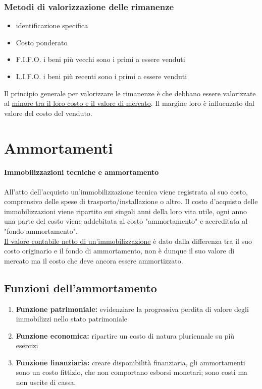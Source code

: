 \documentclass{report}
\begin{document}
	\subsubsection{Metodi di valorizzazione delle rimanenze}
	\begin{itemize}
		\item identificazione specifica
		\item Costo ponderato
		\item F.I.F.O. i beni più vecchi sono i primi a essere venduti
		\item L.I.F.O. i beni più recenti sono i primi a essere venduti
	\end{itemize}
	Il principio generale per valorizzare le rimanenze è che debbano essere valorizzate al \underline{minore tra il loro costo e il valore di mercato}. Il margine loro è influenzato dal valore del costo del venduto.
	\section{Ammortamenti}
	\paragraph{Immobilizzazioni tecniche e ammortamento}
	All'atto dell'acquisto un'immobilizzazione tecnica viene registrata al suo costo, comprensivo delle spese di trasporto/installazione o altro. Il costo d'acquisto delle immobilizzazioni viene ripartito sui singoli anni della loro vita utile, ogni anno una parte del costo viene addebitata al costo "ammortamento" e accreditata al "fondo ammortamento".
	\medskip \\\underline{Il valore contabile netto di un'immobilizzazione} è dato dalla differenza tra il suo costo originario e il fondo di ammortamento, non è dunque il suo valore di mercato ma il costo che deve ancora essere ammortizzato.
	\subsection{Funzioni dell'ammortamento}
	\begin{enumerate}
		\item \textbf{Funzione patrimoniale:} evidenziare la progressiva perdita di valore degli immobilizzi nello stato patrimoniale
		\item \textbf{Funzione economica:} ripartire un costo di natura pluriennale su più esercizi
		\item \textbf{Funzione finanziaria:} creare disponibilità finanziaria, gli ammortamenti sono un costo fittizio, che non comportano esborsi monetari; sono costi ma non uscite di cassa.
	\end{enumerate}
\end{document}
